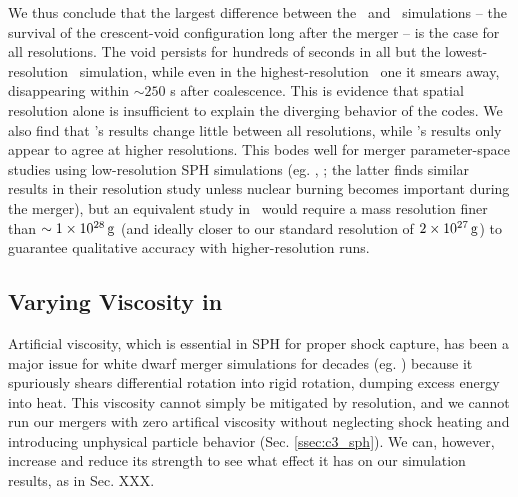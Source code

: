 
We thus conclude that the largest difference between the \gasoline\ and \arepo\ simulations -- the survival of the crescent-void configuration long after the merger -- is the case for all resolutions.  The void persists for hundreds of seconds in all but the lowest-resolution \arepo\ simulation, while even in the highest-resolution \gasoline\ one it smears away, disappearing within $\sim 250$ s after coalescence.  This is evidence that spatial resolution alone is insufficient to explain the diverging behavior of the codes.  We also find that \gasoline's results change little between all resolutions, while \arepo's results only appear to agree at higher resolutions.  This bodes well for merger parameter-space studies using low-resolution SPH simulations (eg. \citeal{zhu+13}, \citealt{dan+14}; the latter finds similar results in their resolution study unless nuclear burning becomes important during the merger), but an equivalent study in \arepo\ would require a mass resolution finer than $\sim1\times10^{28}\,\mathrm{g}$ (and ideally closer to our standard resolution of $2\times10^{27}\,\mathrm{g}$) to guarantee qualitative accuracy with higher-resolution runs.

\subsection{Varying Viscosity in \gasoline}
\label{ssec:c3_vary_visc}

Artificial viscosity, which is essential in SPH for proper shock capture, has been a major issue for white dwarf merger simulations for decades (eg. \citealt{guerig04, loreig09}) because it spuriously shears differential rotation into rigid rotation, dumping excess energy into heat.  This viscosity cannot simply be mitigated by resolution, and we cannot run our mergers with zero artifical viscosity without neglecting shock heating and introducing unphysical particle behavior (Sec. \ref{ssec:c3_sph}).  We can, however, increase and reduce its strength to see what effect it has on our simulation results, as in \citeal{zhu+13} {\charles Sec. XXX}.

